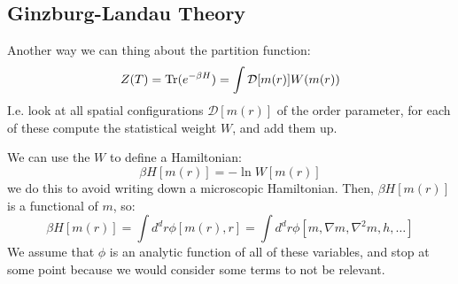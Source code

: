 \subsection{Ginzburg-Landau Theory}
Another way we can thing about the partition function:
\begin{equation}
    Z(T) = \mathrm{Tr}(e^{-\beta H}) = \int \mathcal{D}[m(r)] W(m(r))
\end{equation}
I.e. look at all spatial configurations $\mathcal{D}[m(r)]$ of the order parameter, for each of these compute the statistical weight $W$, and add them up. 

We can use the $W$ to define a Hamiltonian:
\begin{equation}
    \beta H[m(r)] = -\ln W[m(r)]
\end{equation}
we do this to avoid writing down a microscopic Hamiltonian. Then, $\beta H[m(r)]$ is a functional of $m$, so:
\begin{equation}
    \beta H[m(r)] = \int d^dr \phi[m(r), r] = \int d^d r \phi[m, \nabla m, \nabla^2m, h, \ldots]
\end{equation}
We assume that $\phi$ is an analytic function of all of these variables, and stop at some point because we would consider some terms to not be relevant.